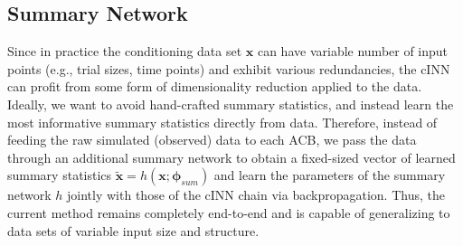\documentclass[9pt,twoside,lineno]{pnas-new}
\begin{document}
\subsection*{Summary Network}
Since in practice the conditioning data set $\boldsymbol{x}$ can have variable number of input points (e.g., trial sizes, time points) and exhibit various redundancies, the cINN can profit from some form of dimensionality reduction applied to the data. Ideally, we want to avoid hand-crafted summary statistics, and instead learn the most informative summary statistics directly from data. Therefore, instead of feeding the raw simulated (observed) data to each ACB, we pass the data through an additional summary network to obtain a fixed-sized vector of learned summary statistics $\tilde{\boldsymbol{x}} = h(\boldsymbol{x};\boldsymbol{\phi}_{sum})$ and learn the parameters of the summary network $h$ jointly with those of the cINN chain via backpropagation. Thus, the current method remains completely end-to-end and is capable of generalizing to data sets of variable input size and structure.
\end{document}
